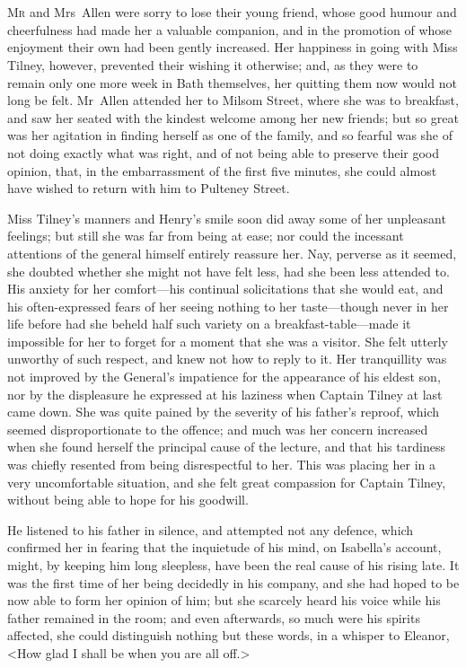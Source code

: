 \chapter[Chapter \thechapter]{} 

\lettrine{M}{r} and Mrs~Allen were sorry to lose their young friend, whose good humour and cheerfulness had made her a valuable companion, and in the promotion of whose enjoyment their own had been gently increased. Her happiness in going with Miss Tilney, however, prevented their wishing it otherwise; and, as they were to remain only one more week in Bath themselves, her quitting them now would not long be felt. Mr~Allen attended her to Milsom Street, where she was to breakfast, and saw her seated with the kindest welcome among her new friends; but so great was her agitation in finding herself as one of the family, and so fearful was she of not doing exactly what was right, and of not being able to preserve their good opinion, that, in the embarrassment of the first five minutes, she could almost have wished to return with him to Pulteney Street. 

 Miss Tilney's manners and Henry's smile soon did away some of her unpleasant feelings; but still she was far from being at ease; nor could the incessant attentions of the general himself entirely reassure her. Nay, perverse as it seemed, she doubted whether she might not have felt less, had she been less attended to. His anxiety for her comfort—his continual solicitations that she would eat, and his often-expressed fears of her seeing nothing to her taste—though never in her life before had she beheld half such variety on a breakfast-table—made it impossible for her to forget for a moment that she was a visitor. She felt utterly unworthy of such respect, and knew not how to reply to it. Her tranquillity was not improved by the General's impatience for the appearance of his eldest son, nor by the displeasure he expressed at his laziness when Captain Tilney at last came down. She was quite pained by the severity of his father's reproof, which seemed disproportionate to the offence; and much was her concern increased when she found herself the principal cause of the lecture, and that his tardiness was chiefly resented from being disrespectful to her. This was placing her in a very uncomfortable situation, and she felt great compassion for Captain Tilney, without being able to hope for his goodwill. 

 He listened to his father in silence, and attempted not any defence, which confirmed her in fearing that the inquietude of his mind, on Isabella's account, might, by keeping him long sleepless, have been the real cause of his rising late. It was the first time of her being decidedly in his company, and she had hoped to be now able to form her opinion of him; but she scarcely heard his voice while his father remained in the room; and even afterwards, so much were his spirits affected, she could distinguish nothing but these words, in a whisper to Eleanor, <How glad I shall be when you are all off.> 

